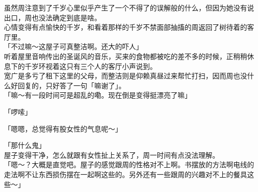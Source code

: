虽然周注意到了千岁心里似乎产生了一个不得了的误解般的什么，但因为她没有说出口，周也没法确定到底是啥。\\

心情变得有点愉快的千岁，和看着那样的千岁不禁面部抽搐的周返回了树待着的客厅里。\\



「不过嘛～这屋子可真整洁啊。还大的吓人」\\

听着屋里音响传出的圣诞风的音乐，买来的食物都被吃的差不多的时候，正稍稍休息下的千岁环视着这只有三个人的客厅小声说到。\\

宽广是多亏了租下这里的父母，而整洁则是仰赖真昼过来帮忙打扫，因而周也没什么好回复的，只好答了一句「嘛谢了」。\\

「嘛～有一段时间可是超乱的嘞。现在倒是变得挺漂亮了嘛」

「啰嗦」

「嗯嗯，总觉得有股女性的气息呢～」

「那什么鬼」\\

屋子变得干净，怎么就跟有女性扯上关系了，周一时间有点没法理解。\\

「嗯～？大概是直觉吧。屋子的感觉跟周的性格对不上啊。书摆放的方法啊电线的走法啊不让东西损伤摆在一起啊这些的。另外还有一些跟周的兴趣对不上的餐具这些～」

